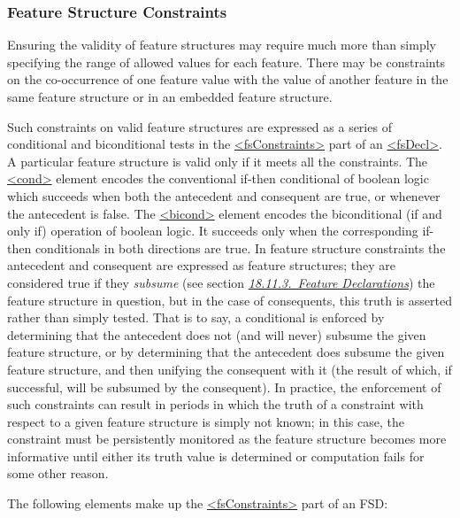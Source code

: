 \subsubsection[{Feature Structure Constraints}]{Feature Structure Constraints}\label{FDFS}\par
Ensuring the validity of feature structures may require much more than simply specifying the range of allowed values for each feature. There may be constraints on the co-occurrence of one feature value with the value of another feature in the same feature structure or in an embedded feature structure.\par
Such constraints on valid feature structures are expressed as a series of conditional and biconditional tests in the \hyperref[TEI.fsConstraints]{<fsConstraints>} part of an \hyperref[TEI.fsDecl]{<fsDecl>}. A particular feature structure is valid only if it meets all the constraints. The \hyperref[TEI.cond]{<cond>} element encodes the conventional if-then conditional of boolean logic which succeeds when both the antecedent and consequent are true, or whenever the antecedent is false. The \hyperref[TEI.bicond]{<bicond>} element encodes the biconditional (if and only if) operation of boolean logic. It succeeds only when the corresponding if-then conditionals in both directions are true.  In feature structure constraints the antecedent and consequent are expressed as feature structures; they are considered true if they \textit{subsume} (see section \textit{\hyperref[FDFD]{18.11.3.\ Feature Declarations}}) the feature structure in question, but in the case of consequents, this truth is asserted rather than simply tested. That is to say, a conditional is enforced by determining that the antecedent does not (and will never) subsume the given feature structure, or by determining that the antecedent does subsume the given feature structure, and then unifying the consequent with it (the result of which, if successful, will be subsumed by the consequent). In practice, the enforcement of such constraints can result in periods in which the truth of a constraint with respect to a given feature structure is simply not known; in this case, the constraint must be persistently monitored as the feature structure becomes more informative until either its truth value is determined or computation fails for some other reason.\par
The following elements make up the \hyperref[TEI.fsConstraints]{<fsConstraints>} part of an FSD: 
